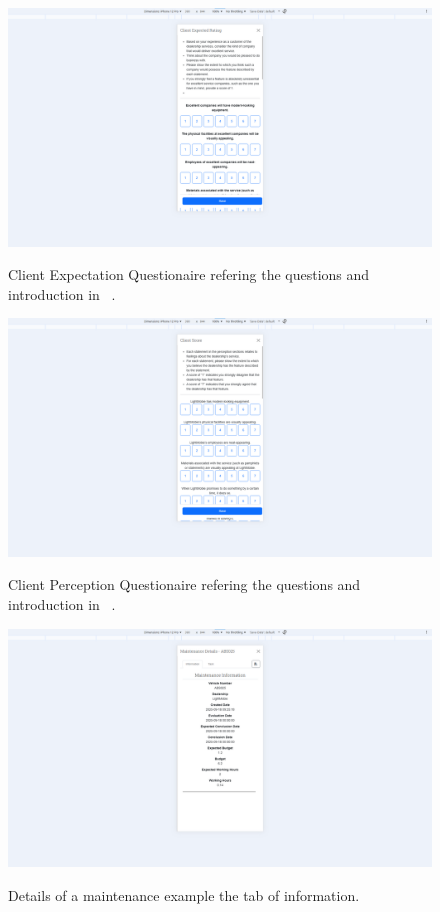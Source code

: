 \begin{figure}[htbp]
  \caption{Client Expectation Questionaire refering the questions and introduction in ~\cite{master_servqual_model}.}
  \centering
  \includegraphics[width=\textwidth]{figs/Implementation/client/ExpectationQuestionare}
  \label{fig:ExpectationQuestionare}
\end{figure}


\begin{figure}[htbp]
  \caption{Client Perception Questionaire refering the questions and introduction in ~\cite{master_servqual_model}.}
  \centering
  \includegraphics[width=\textwidth]{figs/Implementation/client/PerceptionQuestionare}
  \label{fig:PerceptionQuestionare}
\end{figure}


\begin{figure}[htbp]
  \caption{Details of a maintenance example the tab of information.}
  \centering
  \includegraphics[width=\textwidth]{figs/Implementation/client/MaintenanceDetailsInfo}
  \label{fig:MaintenanceDetailsInfo}
\end{figure}


